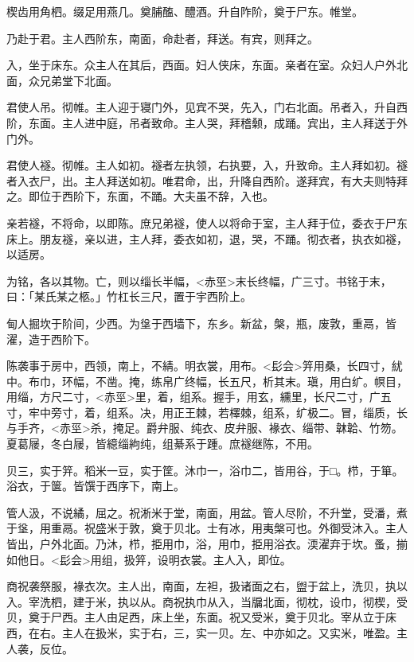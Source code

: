 \documentclass[]{article}
\begin{document}
楔齿用角柶。缀足用燕几。奠脯醢、醴酒。升自阼阶，奠于尸东。帷堂。

乃赴于君。主人西阶东，南面，命赴者，拜送。有宾，则拜之。

入，坐于床东。众主人在其后，西面。妇人侠床，东面。亲者在室。众妇人户外北面，众兄弟堂下北面。

君使人吊。彻帷。主人迎于寝门外，见宾不哭，先入，门右北面。吊者入，升自西阶，东面。主人进中庭，吊者致命。主人哭，拜稽颡，成踊。宾出，主人拜送于外门外。

君使人襚。彻帷。主人如初。襚者左执领，右执要，入，升致命。主人拜如初。襚者入衣尸，出。主人拜送如初。唯君命，出，升降自西阶。遂拜宾，有大夫则特拜之。即位于西阶下，东面，不踊。大夫虽不辞，入也。

亲若襚，不将命，以即陈。庶兄弟襚，使人以将命于室，主人拜于位，委衣于尸东床上。朋友襚，亲以进，主人拜，委衣如初，退，哭，不踊。彻衣者，执衣如襚，以适房。

为铭，各以其物。亡，则以缁长半幅，\textless{}赤巠\textgreater{}末长终幅，广三寸。书铭于末，曰：「某氏某之柩。」竹杠长三尺，置于宇西阶上。

甸人掘坎于阶间，少西。为垼于西墙下，东乡。新盆，槃，瓶，废敦，重鬲，皆濯，造于西阶下。

陈袭事于房中，西领，南上，不綪。明衣裳，用布。\textless{}髟会\textgreater{}笄用桑，长四寸，紌中。布巾，环幅，不凿。掩，练帛广终幅，长五尺，析其末。瑱，用白纩。幎目，用缁，方尺二寸，\textless{}赤巠\textgreater{}里，着，组系。握手，用玄，纁里，长尺二寸，广五寸，牢中旁寸，着，组系。决，用正王棘，若檡棘，组系，纩极二。冒，缁质，长与手齐，\textless{}赤巠\textgreater{}杀，掩足。爵弁服、纯衣、皮弁服、褖衣、缁带、韎韐、竹笏。夏葛屦，冬白屦，皆繶缁絇纯，组綦系于踵。庶襚继陈，不用。

贝三，实于笄。稻米一豆，实于筐。沐巾一，浴巾二，皆用谷，于□。栉，于箪。浴衣，于箧。皆馔于西序下，南上。

管人汲，不说繘，屈之。祝淅米于堂，南面，用盆。管人尽阶，不升堂，受潘，煮于垼，用重鬲。祝盛米于敦，奠于贝北。士有冰，用夷槃可也。外御受沐入。主人皆出，户外北面。乃沐，栉，挋用巾，浴，用巾，挋用浴衣。渜濯弃于坎。蚤，揃如他日。\textless{}髟会\textgreater{}用组，扱笄，设明衣裳。主人入，即位。

商祝袭祭服，褖衣次。主人出，南面，左袒，扱诸面之右，盥于盆上，洗贝，执以入。宰洗柶，建于米，执以从。商祝执巾从入，当牖北面，彻枕，设巾，彻楔，受贝，奠于尸西。主人由足西，床上坐，东面。祝又受米，奠于贝北。宰从立于床西，在右。主人在扱米，实于右，三，实一贝。左、中亦如之。又实米，唯盈。主人袭，反位。
\end{document}
